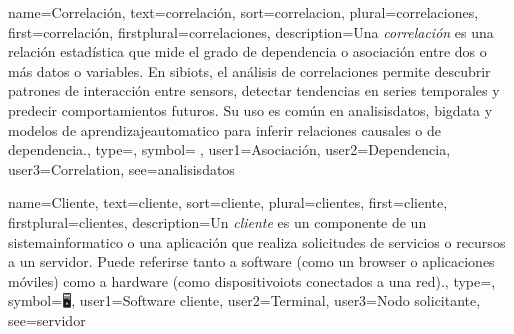 	
	{
		name={Correlaci{\'o}n},
		text={correlaci{\'o}n},
		sort={correlacion},
		plural={correlaciones},
		first={correlaci{\'o}n},
		firstplural={correlaciones},
		description={Una \emph{correlaci{\'o}n} es una relaci{\'o}n estad{\'i}stica que mide el grado de dependencia o asociaci{\'o}n entre dos o m{\'a}s \glspl{dato} o variables. En \glspl{sibiot}, el an{\'a}lisis de correlaciones permite descubrir patrones de interacci{\'o}n entre \glspl{sensor}, detectar tendencias en series temporales y predecir comportamientos futuros. Su uso es com{\'u}n en \gls{analisisdatos}, \gls{bigdata} y modelos de \gls{aprendizajeautomatico} para inferir relaciones causales o de dependencia.},
		type=\glsdefaulttype,
		symbol={🔗},
		user1={Asociaci{\'o}n},
		user2={Dependencia},
		user3={Correlation},
		see={analisisdatos}
	}
	
	{
		name={Cliente},
		text={cliente},
		sort={cliente},
		plural={clientes},
		first={cliente},
		firstplural={clientes},
		description={Un \emph{cliente} es un componente de un \gls{sistemainformatico} o una aplicaci{\'o}n que realiza solicitudes de servicios o recursos a un \gls{servidor}. Puede referirse tanto a software (como un \gls{browser} o aplicaciones m{\'o}viles) como a hardware (como \glspl{dispositivoiot} conectados a una \gls{red}).},
		type=\glsdefaulttype,
		symbol={🖥️},
		user1={Software cliente},
		user2={Terminal},
		user3={Nodo solicitante},
		see={servidor}
	}
	
